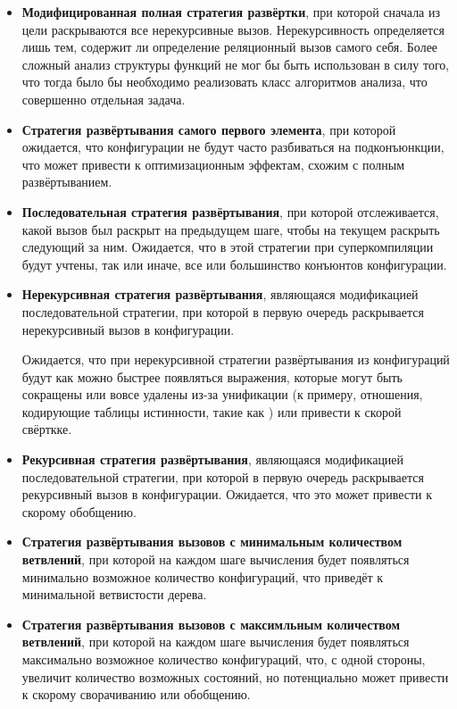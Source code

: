 \begin{itemize}
\item {\bf Модифицированная полная стратегия развёртки}, при которой сначала из цели
      раскрываются все нерекурсивные вызов.
      Нерекурсивность определяется
      лишь тем, содержит ли определение реляционный вызов самого себя. Более сложный
      анализ структуры функций не мог бы быть использован в силу того, что тогда
      было бы необходимо реализовать класс алгоритмов анализа, что совершенно отдельная задача.

\item {\bf Стратегия развёртывания самого первого элемента}, при которой ожидается,
      что конфигурации не будут часто разбиваться на подконъюнкции, что может
      привести к оптимизационным эффектам, схожим с полным развёртыванием.

\item {\bf Последовательная стратегия развёртывания}, при которой отслеживается,
      какой вызов был раскрыт на предыдущем шаге, чтобы на текущем
      раскрыть следующий за ним. Ожидается, что в этой стратегии
      при суперкомпиляции будут учтены, так или иначе, все или большинство конъюнтов
      конфигурации.

\item {\bf Нерекурсивная стратегия развёртывания}, являющаяся модификацией
      последовательной стратегии, при которой в первую очередь
      раскрывается нерекурсивный вызов в конфигурации.

      Ожидается, что при нерекурсивной стратегии развёртывания из конфигураций
      будут как можно быстрее появляться выражения, которые могут быть сокращены
      или вовсе удалены из-за унификации (к примеру, отношения, кодирующие
      таблицы истинности, такие как ) или привести к скорой свёрткке.

\item {\bf Рекурсивная стратегия развёртывания}, являющаяся модификацией
      последовательной стратегии,  при которой в первую очередь
      раскрывается рекурсивный вызов в конфигурации. Ожидается, что это
      может привести к скорому обобщению.

\item {\bf Стратегия развёртывания вызовов с минимальным количеством ветвлений},
      при которой на каждом шаге вычисления будет появляться минимально возможное количество
      конфигураций, что приведёт к минимальной ветвистости дерева.

\item {\bf Стратегия развёртывания вызовов с максимльным количеством ветвлений},
      при которой на каждом шаге вычисления будет появляться максимально возможное количество
      конфигураций, что, с одной стороны, увеличит количество возможных состояний, но
      потенциально может привести к скорому сворачиванию или обобщению.

\end{itemize}

